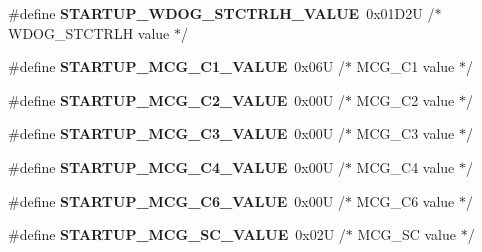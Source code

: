 \begin{DoxyCompactItemize}
\item 
\#define {\bfseries S\+T\+A\+R\+T\+U\+P\+\_\+\+W\+D\+O\+G\+\_\+\+S\+T\+C\+T\+R\+L\+H\+\_\+\+V\+A\+L\+UE}~0x01\+D2\+U   /$\ast$ W\+D\+O\+G\+\_\+\+S\+T\+C\+T\+R\+L\+H value $\ast$/\hypertarget{group___c_p_u___config__module_gaa142ef93cc89cfa2159e3210c590d5e3}{}\label{group___c_p_u___config__module_gaa142ef93cc89cfa2159e3210c590d5e3}

\item 
\#define {\bfseries S\+T\+A\+R\+T\+U\+P\+\_\+\+M\+C\+G\+\_\+\+C1\+\_\+\+V\+A\+L\+UE}~0x06\+U     /$\ast$ M\+C\+G\+\_\+\+C1 value $\ast$/\hypertarget{group___c_p_u___config__module_ga423f07544f083324804fb31fd3ab9009}{}\label{group___c_p_u___config__module_ga423f07544f083324804fb31fd3ab9009}

\item 
\#define {\bfseries S\+T\+A\+R\+T\+U\+P\+\_\+\+M\+C\+G\+\_\+\+C2\+\_\+\+V\+A\+L\+UE}~0x00\+U     /$\ast$ M\+C\+G\+\_\+\+C2 value $\ast$/\hypertarget{group___c_p_u___config__module_ga0616fd220457f605cee44a8bff67701f}{}\label{group___c_p_u___config__module_ga0616fd220457f605cee44a8bff67701f}

\item 
\#define {\bfseries S\+T\+A\+R\+T\+U\+P\+\_\+\+M\+C\+G\+\_\+\+C3\+\_\+\+V\+A\+L\+UE}~0x00\+U     /$\ast$ M\+C\+G\+\_\+\+C3 value $\ast$/\hypertarget{group___c_p_u___config__module_ga37eed483ebd6dc5a36f80324791147b1}{}\label{group___c_p_u___config__module_ga37eed483ebd6dc5a36f80324791147b1}

\item 
\#define {\bfseries S\+T\+A\+R\+T\+U\+P\+\_\+\+M\+C\+G\+\_\+\+C4\+\_\+\+V\+A\+L\+UE}~0x00\+U     /$\ast$ M\+C\+G\+\_\+\+C4 value $\ast$/\hypertarget{group___c_p_u___config__module_gaf596abb9774c22cc6e3434dd8975dcaa}{}\label{group___c_p_u___config__module_gaf596abb9774c22cc6e3434dd8975dcaa}

\item 
\#define {\bfseries S\+T\+A\+R\+T\+U\+P\+\_\+\+M\+C\+G\+\_\+\+C6\+\_\+\+V\+A\+L\+UE}~0x00\+U     /$\ast$ M\+C\+G\+\_\+\+C6 value $\ast$/\hypertarget{group___c_p_u___config__module_ga370fd866412d58e31b4549c77c7d02cd}{}\label{group___c_p_u___config__module_ga370fd866412d58e31b4549c77c7d02cd}

\item 
\#define {\bfseries S\+T\+A\+R\+T\+U\+P\+\_\+\+M\+C\+G\+\_\+\+S\+C\+\_\+\+V\+A\+L\+UE}~0x02\+U     /$\ast$ M\+C\+G\+\_\+\+S\+C value $\ast$/\hypertarget{group___c_p_u___config__module_ga4760fb0aeb1120b796718c3fa53437b2}{}\label{group___c_p_u___config__module_ga4760fb0aeb1120b796718c3fa53437b2}


\end{DoxyCompactItemize}
